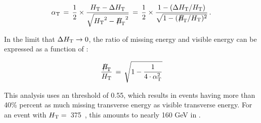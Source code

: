 \begin{equation}
  \label{eq:alphat2}
  \alphat\, = \,\frac{1}{2} \times \frac{\scalht -
    \dht}{\sqrt{\scalht^2 - \mht^2}} \, = \,\frac{1}{2} \times 
  \frac{1 - (\dht/\scalht)}{\sqrt{1 - (\mht/\scalht)^2}} \, . 
\end{equation}

In the limit that  $\Delta\mbox{$H_\text{T}$} \rightarrow 0$, the ratio of missing energy and
visible energy can be expressed as a function of \alphat:

\begin{equation}
  \label{eq:alphat3}
  \frac{\mht}{\scalht} \, = \, \sqrt{ 1 - \frac{1}{4 \cdot \alphat^2} }
\end{equation}

This analysis uses an \alphat threshold of 0.55, which results in events
having more than 40\% percent as much missing transverse energy as visible transverse
energy. For an event with $\mbox{$H_\text{T}$}=$~375~\gev, this amounts to nearly 160 GeV in \mht.  
%
